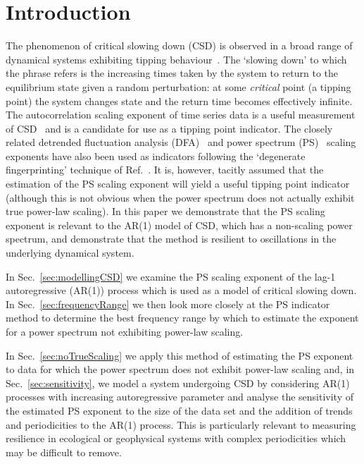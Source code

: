 \documentclass[10pt]{iopart}
\begin{document}
\section{Introduction}
\label{sec:Intro}

The phenomenon of critical slowing down (CSD) is observed in a broad range of dynamical systems exhibiting tipping behaviour~\cite{scheffer2001,lenton2008,scheffer2009,scheffer2009critical, dakos2011slowing}. The `slowing down' to which the phrase refers is the increasing times taken by the system to return to the equilibrium state given a random perturbation: at some \emph{critical} point (a tipping point) the system changes state and the return time becomes effectively infinite. The autocorrelation scaling exponent of time series data is a useful measurement of CSD~ \cite{scheffer2009critical} and is a candidate for use as a tipping point indicator. The closely related detrended fluctuation analysis (DFA)~\cite{kantelhardt2001,livina2007} and power spectrum (PS)~\cite{prettyman2018,prettyman2019} scaling exponents have also been used as indicators following the `degenerate fingerprinting' technique of Ref.~\cite{held2004}. It is, however, tacitly assumed that the estimation of the PS scaling exponent will yield a useful tipping point indicator (although this is not obvious when the power spectrum does not actually exhibit true power-law scaling). In this paper we demonstrate that the PS scaling exponent is relevant to the AR(1) model of CSD, which has a non-scaling power spectrum, and demonstrate that the method is resilient to oscillations in the underlying dynamical system. 

In Sec.~\ref{sec:modellingCSD} we examine the PS scaling exponent of the lag-1 autoregressive (AR(1)) process which is used as a model of critical slowing down. In Sec.~\ref{sec:frequencyRange} we then look more closely at the PS indicator method to determine the best frequency range by which to estimate the exponent for a power spectrum not exhibiting power-law scaling.


In Sec.~\ref{sec:noTrueScaling} we apply this method of estimating the PS exponent to data for which the power spectrum does not exhibit power-law scaling and, in Sec.~\ref{sec:sensitivity}, we model a system undergoing CSD by considering AR(1) processes with increasing autoregressive parameter and analyse the sensitivity of the estimated PS exponent to the size of the data set and the addition of trends and periodicities to the AR(1) process. This is particularly relevant to measuring resilience in ecological or geophysical systems with complex periodicities which may be difficult to remove.
\end{document}
